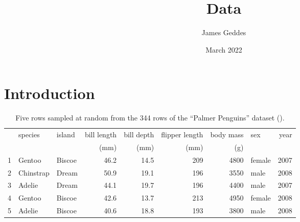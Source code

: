\documentclass[10pt, a4paper, twocolumn]{article}
\author{James Geddes}
\date{March 2022}
\title{Data}
\begin{document}
\maketitle
\section{Introduction}
\begin{table*}[!ht]
\centering\small
\begin{tabular}{@{}rllrrrrlr@{}}
  \toprule
 & species & island & bill length & bill depth & flipper length & body mass & sex & year \\ 
 & & & (mm) & (mm) & (mm) & (g) & &  \\ 
  \midrule
  1 & Gentoo & Biscoe & 46.2 & 14.5 & 209 & 4800 & female & 2007 \\ 
  2 & Chinstrap & Dream & 50.9 & 19.1 & 196 & 3550 & male & 2008 \\ 
  3 & Adelie & Dream & 44.1 & 19.7 & 196 & 4400 & male & 2007 \\ 
  4 & Gentoo & Biscoe & 42.6 & 13.7 & 213 & 4950 & female & 2008 \\ 
  5 & Adelie & Biscoe & 40.6 & 18.8 & 193 & 3800 & male & 2008 \\ 
  \bottomrule
\end{tabular}
\caption{Five rows sampled at random from the 344 rows of the ``Palmer Penguins''
  dataset (\cite{palmerpenguins}).\label{tbl:penguins}}
\end{table*}
\end{document}
